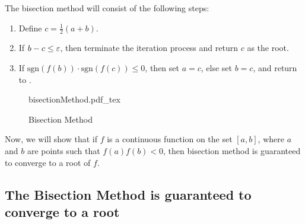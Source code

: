 The bisection method will consist of the following steps: 

\begin{theoremBox}
    \begin{enumerate}
        \item[] Define $c = \frac{1}{2}(a+b)$.
        \item[] If $b - c \leq \varepsilon$, then terminate the iteration process and return $c$ as the root.
        \item[] If $\mbox{sgn}(f(b)) \cdot \mbox{sgn}(f(c)) \leq 0$, then set $a = c$, else set $b = c$, and return to .    
    \end{enumerate}
\end{theoremBox}

\begin{figure}[H]
    \centering
    \def\svgwidth{0.8\columnwidth}
    {bisectionMethod.pdf_tex}
    \caption{Bisection Method}
    \label{fig1:feb21A}
\end{figure}

Now, we will show that if $f$ is a continuous function on the set $[a,b]$, where $a$ and $b$ are points such that $f(a)f(b) < 0$, then bisection method is guaranteed to converge to a root of $f$. 

\subsection{The Bisection Method is guaranteed to converge to a root}


